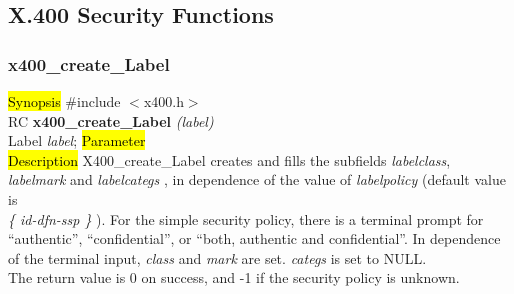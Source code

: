 \subsection{X.400 Security Functions}

\subsubsection{x400\_create\_Label}
\label{x4_cr_Lab}
\hl{Synopsis}
\#include $<$x400.h$>$ \\ [1ex]
RC {\bf x400\_create\_Label} {\em (label)} \\
Label {\em *label};
\hl{Parameter}
 \\[1ex]
\hl{Description}
X400\_create\_Label
creates and fills the subfields
{\em label\pf class}, {\em label\pf mark} and {\em label\pf categs} ,
in dependence of the value of {\em label\pf policy}
(default value is
\\
{\em \{ id-dfn-ssp \} }).
For the simple security policy,
there is a terminal prompt for
``authentic'', ``confidential'', or ``both, authentic and confidential''.
In dependence of the terminal input, {\em class} and {\em mark}
are set. {\em categs} is set to NULL.
\\
The return value is 0 on success, and -1 if the security policy
is unknown.

